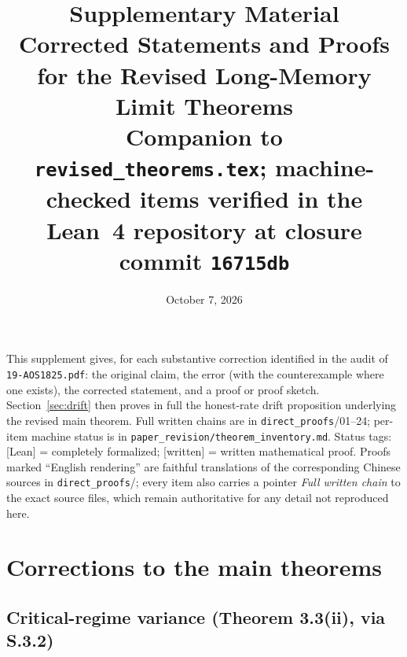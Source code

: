 \documentclass[11pt]{article}
\title{Supplementary Material\\
\large Corrected Statements and Proofs for the Revised Long-Memory
Limit Theorems\\
\footnotesize Companion to \texttt{revised\_theorems.tex}; machine-checked
items verified in the Lean~4 repository at closure commit \texttt{16715db}}
\author{}
\date{October 7, 2026}
\theoremstyle{definition}
\theoremstyle{remark}
\newcommand{\Wlean}{[Lean]}
\newcommand{\Wwritten}{[written]}
\begin{document}
\maketitle

\noindent This supplement gives, for each substantive correction identified in
the audit of \texttt{19-AOS1825.pdf}: the original claim, the error (with the
counterexample where one exists), the corrected statement, and a proof or
proof sketch. Section~\ref{sec:drift} then proves in full the honest-rate
drift proposition underlying the revised main theorem. Full written chains are
in \texttt{direct\_proofs}/01--24; per-item machine status is in
\texttt{paper\_revision/theorem\_inventory.md}.
Status tags: \Wlean{} = completely formalized;
\Wwritten{} = written mathematical proof. Proofs marked ``English rendering''
are faithful translations of the corresponding Chinese sources in
\texttt{direct\_proofs}/; every item also carries a pointer
\emph{Full written chain} to the exact source files, which remain authoritative
for any detail not reproduced here.

\section{Corrections to the main theorems}\label{sec:main-corr}

\subsection{Critical-regime variance (Theorem 3.3(ii), via S.3.2)}
\end{document}
